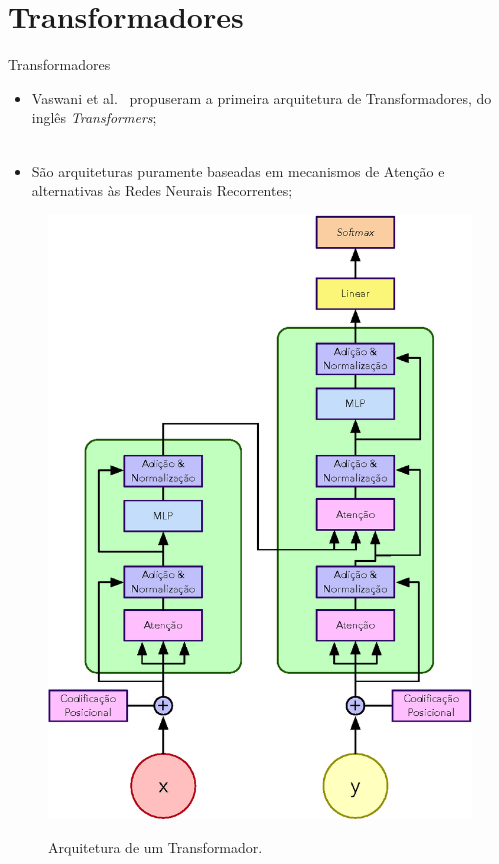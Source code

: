 \section{Transformadores}
\label{s.transformer}

\begin{frame}{Transformadores}
	\begin{itemize}
		\justifying
		\item Vaswani et al.~\cite{Vaswani:17} propuseram a primeira arquitetura de Transformadores, do inglês \emph{Transformers};
		\\~\\
		\item São arquiteturas puramente baseadas em mecanismos de Atenção e alternativas às Redes Neurais Recorrentes;	
	\end{itemize}
\end{frame}

\begin{frame}
	\vspace*{0.5cm}
	\begin{figure}[!ht]
		\centering
		\includegraphics[scale=0.45]{figs/transformer.eps}	
		\label{f.transformer}
		\caption{Arquitetura de um Transformador.}
	\end{figure}
\end{frame}

